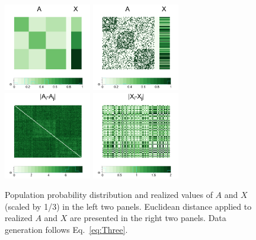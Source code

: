 \documentclass[12pt]{article}
\theoremstyle{definition}
\begin{document}
\begin{figure}[H]
	\centering
	\includegraphics[width=1.5in]{../Figure/pmat.png}
	\includegraphics[width=1.5in]{../Figure/Amat.png}
	\includegraphics[width=1.5in]{../Figure/distA.png}
	\includegraphics[width=1.5in]{../Figure/distX.png}
	\caption{Population probability distribution and realized values of $A$ and $X$ (scaled by 1/3) in the left two panels. Euclidean distance applied to realized $A$ and $X$ are presented in the right two panels. Data generation follows Eq.~\ref{eq:Three}.}
	\label{fig:matrics}
\end{figure}	
\end{document}
